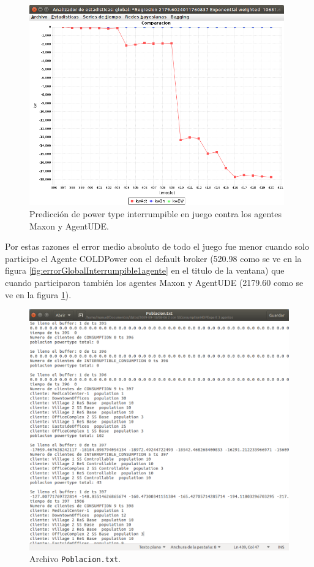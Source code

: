 \begin{figure}[ht]
	\centering
	\includegraphics[width=11cm]{img/errorGlobalInterrumpible3agentes.png}
	\caption{Predicción de power type interrumpible en juego contra los agentes Maxon y AgentUDE.}
	\label{fig:errorGlobalInterrumpible3agentes}
\end{figure}

Por estas razones el error medio absoluto de todo el juego fue menor cuando solo participo el Agente COLDPower con el default broker (520.98 como se ve en la figura \ref{fig:errorGlobalInterrumpible1agente} en el titulo de la ventana) que cuando participaron también los agentes Maxon y AgentUDE (2179.60 como se ve en la figura \ref{fig:errorGlobalInterrumpible3agentes}).

\begin{figure}[ht]
	\centering
	\includegraphics[width=11.25cm]{img/poblaciontxt.png}
	\caption{Archivo \texttt{Poblacion.txt}.}
	\label{fig:poblaciontxt}
\end{figure}

